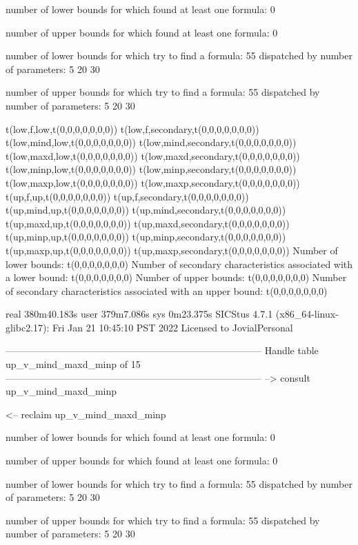 number of lower bounds for which found at least one formula: 0

number of upper bounds for which found at least one formula: 0

number of lower bounds for which try to find a formula: 55
dispatched by number of parameters: 5  20  30

number of upper bounds for which try to find a formula: 55
dispatched by number of parameters: 5  20  30

t(low,f,low,t(0,0,0,0,0,0,0))
t(low,f,secondary,t(0,0,0,0,0,0,0))
t(low,mind,low,t(0,0,0,0,0,0,0))
t(low,mind,secondary,t(0,0,0,0,0,0,0))
t(low,maxd,low,t(0,0,0,0,0,0,0))
t(low,maxd,secondary,t(0,0,0,0,0,0,0))
t(low,minp,low,t(0,0,0,0,0,0,0))
t(low,minp,secondary,t(0,0,0,0,0,0,0))
t(low,maxp,low,t(0,0,0,0,0,0,0))
t(low,maxp,secondary,t(0,0,0,0,0,0,0))
t(up,f,up,t(0,0,0,0,0,0,0))
t(up,f,secondary,t(0,0,0,0,0,0,0))
t(up,mind,up,t(0,0,0,0,0,0,0))
t(up,mind,secondary,t(0,0,0,0,0,0,0))
t(up,maxd,up,t(0,0,0,0,0,0,0))
t(up,maxd,secondary,t(0,0,0,0,0,0,0))
t(up,minp,up,t(0,0,0,0,0,0,0))
t(up,minp,secondary,t(0,0,0,0,0,0,0))
t(up,maxp,up,t(0,0,0,0,0,0,0))
t(up,maxp,secondary,t(0,0,0,0,0,0,0))
Number of lower bounds:                                             t(0,0,0,0,0,0,0)
Number of secondary characteristics associated with a lower bound:  t(0,0,0,0,0,0,0)
Number of upper bounds:                                             t(0,0,0,0,0,0,0)
Number of secondary characteristics associated with an upper bound: t(0,0,0,0,0,0,0)

real	380m40.183s
user	379m7.086s
sys	0m23.375s
SICStus 4.7.1 (x86_64-linux-glibc2.17): Fri Jan 21 10:45:10 PST 2022
Licensed to JovialPersonal


--------------------------------------------------------------------------------
Handle table up_v_mind_maxd_minp of 15
--------------------------------------------------------------------------------
--> consult up_v_mind_maxd_minp

<-- reclaim up_v_mind_maxd_minp

number of lower bounds for which found at least one formula: 0

number of upper bounds for which found at least one formula: 0

number of lower bounds for which try to find a formula: 55
dispatched by number of parameters: 5  20  30

number of upper bounds for which try to find a formula: 55
dispatched by number of parameters: 5  20  30

